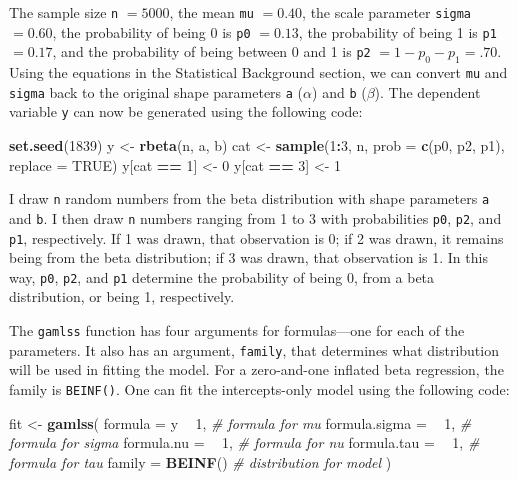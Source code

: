 \documentclass[english,man]{apa6}
\newenvironment{Shaded}{\begin{snugshade}}{\end{snugshade}}
\newcommand{\KeywordTok}[1]{\textcolor[rgb]{0.13,0.29,0.53}{\textbf{#1}}}
\newcommand{\DataTypeTok}[1]{\textcolor[rgb]{0.13,0.29,0.53}{#1}}
\newcommand{\DecValTok}[1]{\textcolor[rgb]{0.00,0.00,0.81}{#1}}
\newcommand{\StringTok}[1]{\textcolor[rgb]{0.31,0.60,0.02}{#1}}
\newcommand{\CommentTok}[1]{\textcolor[rgb]{0.56,0.35,0.01}{\textit{#1}}}
\newcommand{\OtherTok}[1]{\textcolor[rgb]{0.56,0.35,0.01}{#1}}
\newcommand{\OperatorTok}[1]{\textcolor[rgb]{0.81,0.36,0.00}{\textbf{#1}}}
\newcommand{\NormalTok}[1]{#1}
\theoremstyle{definition}
\theoremstyle{definition}
\theoremstyle{remark}
\begin{document}
The sample size \texttt{n} \(= 5000\), the mean \texttt{mu} \(= 0.40\),
the scale parameter \texttt{sigma} \(= 0.60\), the probability of being
0 is \texttt{p0} \(= 0.13\), the probability of being 1 is \texttt{p1}
\(= 0.17\), and the probability of being between 0 and 1 is \texttt{p2}
\(= 1 - p_0 - p_1 = .70\). Using the equations in the Statistical
Background section, we can convert \texttt{mu} and \texttt{sigma} back
to the original shape parameters \texttt{a} (\(\alpha\)) and \texttt{b}
(\(\beta\)). The dependent variable \texttt{y} can now be generated
using the following code:

\begin{Shaded}
\begin{Highlighting}[]
\KeywordTok{set.seed}\NormalTok{(}\DecValTok{1839}\NormalTok{)}
\NormalTok{y <-}\StringTok{ }\KeywordTok{rbeta}\NormalTok{(n, a, b)}
\NormalTok{cat <-}\StringTok{ }\KeywordTok{sample}\NormalTok{(}\DecValTok{1}\OperatorTok{:}\DecValTok{3}\NormalTok{, n, }\DataTypeTok{prob =} \KeywordTok{c}\NormalTok{(p0, p2, p1), }\DataTypeTok{replace =} \OtherTok{TRUE}\NormalTok{)}
\NormalTok{y[cat }\OperatorTok{==}\StringTok{ }\DecValTok{1}\NormalTok{] <-}\StringTok{ }\DecValTok{0}
\NormalTok{y[cat }\OperatorTok{==}\StringTok{ }\DecValTok{3}\NormalTok{] <-}\StringTok{ }\DecValTok{1}
\end{Highlighting}
\end{Shaded}

I draw \texttt{n} random numbers from the beta distribution with shape
parameters \texttt{a} and \texttt{b}. I then draw \texttt{n} numbers
ranging from 1 to 3 with probabilities \texttt{p0}, \texttt{p2}, and
\texttt{p1}, respectively. If 1 was drawn, that observation is 0; if 2
was drawn, it remains being from the beta distribution; if 3 was drawn,
that observation is 1. In this way, \texttt{p0}, \texttt{p2}, and
\texttt{p1} determine the probability of being 0, from a beta
distribution, or being 1, respectively.

The \texttt{gamlss} function has four arguments for formulas---one for
each of the parameters. It also has an argument, \texttt{family}, that
determines what distribution will be used in fitting the model. For a
zero-and-one inflated beta regression, the family is \texttt{BEINF()}.
One can fit the intercepts-only model using the following code:

\begin{Shaded}
\begin{Highlighting}[]
\NormalTok{fit <-}\StringTok{ }\KeywordTok{gamlss}\NormalTok{(}
  \DataTypeTok{formula =}\NormalTok{ y }\OperatorTok{~}\StringTok{ }\DecValTok{1}\NormalTok{,     }\CommentTok{# formula for mu}
  \DataTypeTok{formula.sigma =} \OperatorTok{~}\StringTok{ }\DecValTok{1}\NormalTok{, }\CommentTok{# formula for sigma}
  \DataTypeTok{formula.nu =} \OperatorTok{~}\StringTok{ }\DecValTok{1}\NormalTok{,    }\CommentTok{# formula for nu}
  \DataTypeTok{formula.tau =} \OperatorTok{~}\StringTok{ }\DecValTok{1}\NormalTok{,   }\CommentTok{# formula for tau}
  \DataTypeTok{family =} \KeywordTok{BEINF}\NormalTok{()     }\CommentTok{# distribution for model}
\NormalTok{)}
\end{Highlighting}
\end{Shaded}
\end{document}
